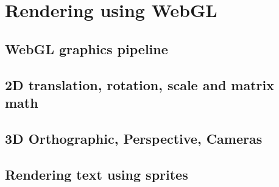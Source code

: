 \chapter{Rendering using WebGL}
\section{WebGL graphics pipeline}
\section{2D translation, rotation, scale and matrix math}
\section{3D Orthographic, Perspective, Cameras}
\section{Rendering text using sprites}